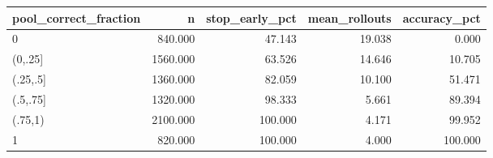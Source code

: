 \begin{tabular}{lrrrr}
\toprule
pool\_correct\_fraction & n & stop\_early\_pct & mean\_rollouts & accuracy\_pct \\
\midrule
0 & 840.000 & 47.143 & 19.038 & 0.000 \\
(0,.25] & 1560.000 & 63.526 & 14.646 & 10.705 \\
(.25,.5] & 1360.000 & 82.059 & 10.100 & 51.471 \\
(.5,.75] & 1320.000 & 98.333 & 5.661 & 89.394 \\
(.75,1) & 2100.000 & 100.000 & 4.171 & 99.952 \\
1 & 820.000 & 100.000 & 4.000 & 100.000 \\
\bottomrule
\end{tabular}
